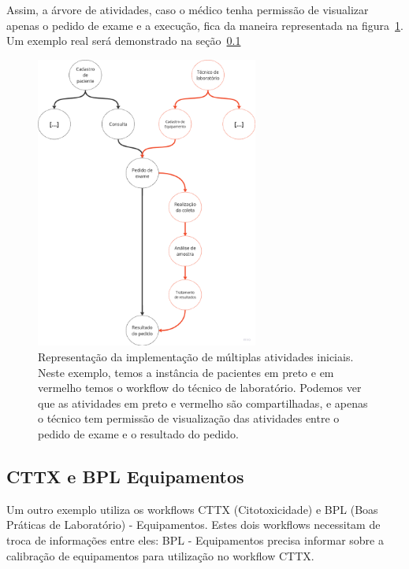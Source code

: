 Assim, a árvore de atividades, caso o médico tenha permissão de visualizar apenas o pedido de exame e a execução, fica da maneira representada na figura~\ref{fig:segunda_implementacao}. Um exemplo real será demonstrado na seção~\ref{sec:cttx_bpl}

\begin{figure}
    \centering
    \includegraphics[width=0.65\textwidth]{imgs/Exemplo/exemplo_pedido_exame.png}
    \caption{Representação da implementação de múltiplas atividades iniciais. Neste exemplo, temos a instância de pacientes em preto e em vermelho temos o workflow do técnico de laboratório. Podemos ver que as atividades em preto e vermelho são compartilhadas, e apenas o técnico tem permissão de visualização das atividades entre o pedido de exame e o resultado do pedido.}
    \label{fig:segunda_implementacao}
\end{figure}


\subsection{CTTX e BPL Equipamentos} \label{sec:cttx_bpl}

Um outro exemplo utiliza os workflows CTTX (Citotoxicidade) e BPL (Boas Práticas de Laboratório) - Equipamentos. Estes dois workflows necessitam de troca de informações entre eles: BPL - Equipamentos precisa informar sobre a calibração de equipamentos para utilização no workflow CTTX.

